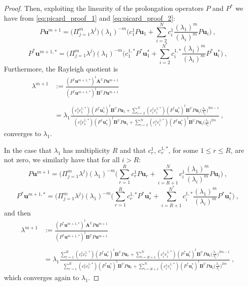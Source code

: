 \documentclass[preprint,12pt]{elsarticle}
\begin{document}
\begin{proof}
Then, exploiting the linearity of the prolongation operators $P$ and $P^*$ we have from \eqref{eq:picard_proof_1} and \eqref{eq:picard_proof_2}:
$$
P\mathbf{u}^{m+1}=\Big(\Pi_{j=1}^m\lambda^{j}\Big)(\lambda_1)^{-m}\Big( c_1^1 P\mathbf{u}_1 +
\sum_{i=2}^N c_i^1\frac{(\lambda_1)^m}{(\lambda_i)^{m}}P\mathbf{u}_i\Big) \ ,
$$
$$
P^*\mathbf{u}^{m+1,*}=\Big(\Pi_{j=1}^m\lambda^{j}\Big)(\lambda_1)^{-m}\Big( c_1^{1,*} P^*\mathbf{u}_1^* +
\sum_{i=2}^{N^*} c_i^{1,*}\frac{(\lambda_1)^m}{(\lambda_i)^{m}}P^*\mathbf{u}_i^*\Big) \ ,
$$
Furthermore, the Rayleigh quotient is
$$
\begin{array}{ll}
\displaystyle\lambda^{m+1}&\displaystyle:=\frac{(P^*\mathbf{u}^{m+1,*})^t\mathbf{A}^U P\mathbf{u}^{m+1}}{(P^*\mathbf{u}^{m+1,*})^t\mathbf{B}^U P\mathbf{u}^{m+1}}\\
\\
&=\lambda_1 \frac{\displaystyle(c_1^1c_1^{1,*})(P^*\mathbf{u}^{*}_1)^t\mathbf{B}^U P\mathbf{u}_1 +
\sum_{i=2}^N (c_i^1c_i^{1,*})(P^*\mathbf{u}^{*}_i)^t\mathbf{B}^U P\mathbf{u}_i\Bigg(\frac{\lambda_1}{\lambda_i}\Bigg)^{2m-1}}
{\displaystyle(c_1^1c_1^{1,*})(P^*\mathbf{u}^{*}_1)^t\mathbf{B}^U P\mathbf{u}_1 +
\sum_{i=2}^N (c_i^1c_i^{1,*})(P^*\mathbf{u}^{*}_i)^t\mathbf{B}^U P\mathbf{u}_i\Bigg(\frac{\lambda_1}{\lambda_i}\Bigg)^{2m}}\ ,
\end{array}
$$
converges to $\lambda_1$.

In the case that $\lambda_1$ has multiplicity $R$ and that $c_r^1$, $c_r^{1,*}$, for some $1\leq r\leq R$, are not zero,
we similarly have that for all $i>R$:
$$
P\mathbf{u}^{m+1}=\Big(\Pi_{j=1}^m\lambda^{j}\Big)(\lambda_1)^{-m}\Big( \sum_{r=1}^Rc_r^1 P\mathbf{u}_r+
\sum_{i=R+1}^N c_i^1\frac{(\lambda_1)^m}{(\lambda_i)^{m}}P\mathbf{u}_i\Big) \ ,
$$
$$
P^*\mathbf{u}^{m+1,*}=\Big(\Pi_{j=1}^m\lambda^{j}\Big)(\lambda_1)^{-m}\Big( \sum_{r=1}^Rc_r^{1,*} P^*\mathbf{u}_r^*+
\sum_{i=R+1}^{N^*} c_i^{1,*}\frac{(\lambda_1)^m}{(\lambda_i)^{m}}P^*\mathbf{u}_i^*\Big) \ ,
$$
and then
$$
\begin{array}{ll}
\displaystyle\lambda^{m+1}&\displaystyle:=\frac{(P^*\mathbf{u}^{m+1,*})^t\mathbf{A}^U P\mathbf{u}^{m+1}}{(P^*\mathbf{u}^{m+1,*})^t\mathbf{B}^U P\mathbf{u}^{m+1}}\\
\\
&\displaystyle=\lambda_1 \frac{\displaystyle \sum_{r=1}^R(c_r^1c_r^{1,*})(P^*\mathbf{u}^{*}_r)^t\mathbf{B}^U P\mathbf{u}_r +
\sum_{i=R+1}^N (c_i^1c_i^{1,*})(P^*\mathbf{u}^{*}_i)^t\mathbf{B}^U P\mathbf{u}_i\Bigg(\frac{\lambda_1}{\lambda_i}\Bigg)^{2m-1}}
{\displaystyle \sum_{r=1}^R(c_r^1c_r^{1,*})(P^*\mathbf{u}^{*}_r)^t\mathbf{B}^U P\mathbf{u}_r +
\sum_{i=R+1}^N (c_i^1c_i^{1,*})(P^*\mathbf{u}^{*}_i)^t\mathbf{B}^U P\mathbf{u}_i\Bigg(\frac{\lambda_1}{\lambda_i}\Bigg)^{2m}}\ ,
\end{array}
$$
which converges again to $\lambda_1$.


\end{proof}
\end{document}
